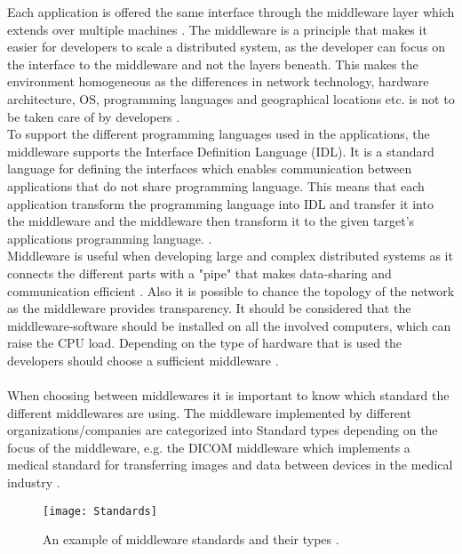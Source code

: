 \documentclass[Main]{subfiles}
\begin{document}
Each application is offered the same interface through the middleware layer which extends over multiple machines \cite[p. 3]{Tanenbaum}. 
The middleware is a principle that makes it easier for developers to scale a distributed system, as the developer can focus on the interface to the middleware and not the layers beneath. 
This makes the environment homogeneous as the differences in network technology, hardware architecture, OS, programming languages and geographical locations etc. is not to be taken care of by developers \cite{DDS-slides} \cite[p. 68]{Coulouris}.
\\
To support the different programming languages used in the applications, the middleware supports the Interface Definition Language (IDL). 
It is a standard language for defining the interfaces which enables communication between applications that do not share programming language. 
This means that each application transform the programming language into IDL and transfer it into the middleware and the middleware then transform it to the given target's applications programming language. \cite{DDS-slides} \cite{RTI} \cite{wiki-idl}.
\\
Middleware is useful when developing large and complex distributed systems as it connects the different parts with a "pipe" that makes data-sharing and communication efficient \cite{DDS-slides} \cite[p. 68]{Coulouris}. 
Also it is possible to chance the topology of the network as the middleware provides transparency. 
It should be considered that the middleware-software should be installed on all the involved computers, which can raise the CPU load.
Depending on the type of hardware that is used the developers should choose a sufficient middleware \cite{DDS-slides}.
\\
\\
When choosing between middlewares it is important to know which standard the different middlewares are using. The middleware implemented by different organizations/companies are categorized into Standard types depending on the focus of the middleware, e.g. the DICOM middleware which implements a medical standard for transferring images and data between devices in the medical industry \cite{DDS_slides}.


\begin{figure}[htbp]
\centering
\texttt{[image: Standards]}
\caption{An example of middleware standards and their types \cite{DDS-slides}.}
\label{fig:standards}
\end{figure}
\end{document}
